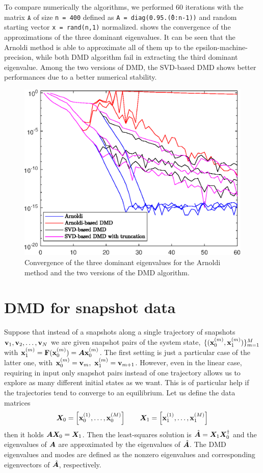 To compare numerically the algorithms, we performed 60 iterations with the matrix $\texttt{A}$ of size \texttt{n = 400} defined as \texttt{A = diag(0.95.\^(0:n-1))} and random starting vector \texttt{x = rand(n,1)} normalized.  shows the convergence of the approximations of the three dominant eigenvalues. It can be seen that the Arnoldi method is able to approximate all of them up to the epsilon-machine-precision, while both DMD algorithm fail in extracting the third dominant eigenvalue. Among the two versions of DMD, the SVD-based DMD shows better performances due to a better numerical stability.

\begin{figure}[h]
    \centering
    \includegraphics[width=0.5\linewidth]{../code/figures/Arnoldi_vs_DMD.eps}
    \caption{Convergence of the three dominant eigenvalues for the Arnoldi method and the two versions of the DMD algorithm.}
    \label{fig_arnoldi_vs_DMD}
\end{figure}

\section{DMD for snapshot data}
Suppose that instead of a snapshots along a single trajectory of snapshots $\vb{v}_1, \vb{v}_2, \dots, \vb{v}_N$ we are given snapshot pairs of the system state, $\{(\vb{x}_0^{(m)}, \vb{x}_1^{(m)})\}_{m = 1}^M$ with $\vb{x}_1^{(m)} = \vb{F}(\vb{x}_0^{(m)}) = \vb*{A}\vb{x}_0^{(m)}$. The first setting is just a particular case of the latter one, with $\vb{x}_0^{(m)} = \vb{v}_m,\,\,\vb{x}_1^{(m)} = \vb{v}_{m+1}$. However, even in the linear case, requiring in input only snapshot pairs instead of one trajectory allows us to explore as many different initial states as we want. This is of particular help if the trajectories tend to converge to an equilibrium. Let us define the data matrices
\begin{equation}
    \label{dmd_matrices}
    \vb*{X}_0 = \left[\vb{x}_0^{(1)}, \dots, \vb{x}_0^{(M)}\right] \qquad \vb*{X}_1 = \left[\vb{x}_1^{(1)}, \dots, \vb{x}_1^{(M)}\right]
\end{equation}
then it holds $\vb*{A}\vb*{X}_0 = \vb*{X}_1$. Then the least-squares solution is $\hat{\vb*{A}} = \vb*{X}_1\vb*{X}_0^{\dagger}$ and the eigenvalues of $\vb*{A}$ are approximated by the eigenvalues of $\hat{\vb*{A}}$. The DMD eigenvalues and modes are defined as the nonzero eigenvalues and corresponding eigenvectors of $\hat{\vb*{A}}$, respectively.

